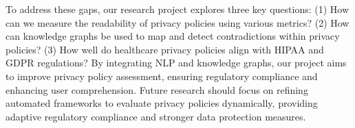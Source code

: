 \documentclass[conference]{IEEEtran}
\begin{document}
To address these gaps, our research project explores three key questions: (1) How can we measure the readability of privacy policies using various metrics? (2) How can knowledge graphs be used to map and detect contradictions within privacy policies? (3) How well do healthcare privacy policies align with HIPAA and GDPR regulations? By integrating NLP and knowledge graphs, our project aims to improve privacy policy assessment, ensuring regulatory compliance and enhancing user comprehension. Future research should focus on refining automated frameworks to evaluate privacy policies dynamically, providing adaptive regulatory compliance and stronger data protection measures.






\end{document}
